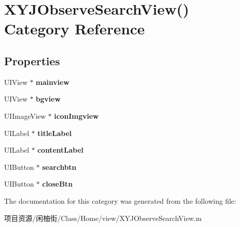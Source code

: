 \hypertarget{category_x_y_j_observe_search_view_07_08}{}\section{X\+Y\+J\+Observe\+Search\+View() Category Reference}
\label{category_x_y_j_observe_search_view_07_08}
\subsection*{Properties}
\begin{DoxyCompactItemize}
\item 
\mbox{\label{category_x_y_j_observe_search_view_07_08_a41e272756c18bc25ec1c7767847f57de}} 
U\+I\+View $\ast$ {\bfseries mainview}
\item 
\mbox{\label{category_x_y_j_observe_search_view_07_08_a3142ed6ab7a01635f74d7009f852430d}} 
U\+I\+View $\ast$ {\bfseries bgview}
\item 
\mbox{\label{category_x_y_j_observe_search_view_07_08_ab1f836c8f434bbe2c58eb944d93870ce}} 
U\+I\+Image\+View $\ast$ {\bfseries icon\+Imgview}
\item 
\mbox{\label{category_x_y_j_observe_search_view_07_08_a32931e7832706fb040c8b055d3c16053}} 
U\+I\+Label $\ast$ {\bfseries title\+Label}
\item 
\mbox{\label{category_x_y_j_observe_search_view_07_08_a25ce281ce3b0d4883a6b5d5fbdd65f78}} 
U\+I\+Label $\ast$ {\bfseries content\+Label}
\item 
\mbox{\label{category_x_y_j_observe_search_view_07_08_af41d0fd22240b7b2a7185518ed2f1e58}} 
U\+I\+Button $\ast$ {\bfseries searchbtn}
\item 
\mbox{\label{category_x_y_j_observe_search_view_07_08_aea19670c68cad3cda8cff8c17ec5c749}} 
U\+I\+Button $\ast$ {\bfseries close\+Btn}
\end{DoxyCompactItemize}


The documentation for this category was generated from the following file\+:\begin{DoxyCompactItemize}
\item 
项目资源/闲柚街/\+Class/\+Home/view/X\+Y\+J\+Observe\+Search\+View.\+m\end{DoxyCompactItemize}
